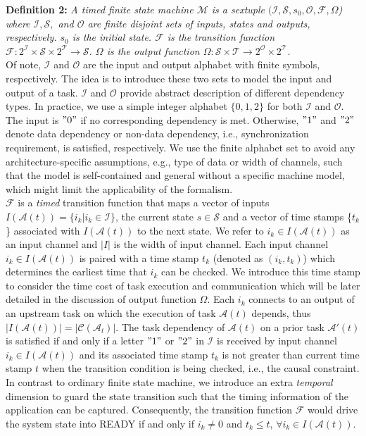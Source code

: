  \noindent \textbf{Definition 2:}\label{def:machine} \textit{ A timed finite state machine $\mathcal M$ is a sextuple $(\mathcal I,\mathcal S, s_{0}, \mathcal O,\mathcal F, \Omega$) where $\mathcal I,\mathcal S,$ and $\mathcal O $ are finite disjoint sets of inputs, states and outputs, respectively. $s_{0}$ is the initial state. $\mathcal F$ is the transition function $\mathcal F: 2^{\mathcal I} \times \mathcal S \times 2^{\mathcal T} \rightarrow \mathcal S$. $\Omega$ is the output function $\Omega: \mathcal S\times \mathcal T \rightarrow 2^{\mathcal O}\times 2^{\mathcal T}$.}\\
 \indent Of note, $\mathcal I$ and $\mathcal O$ are the input and output alphabet with finite symbols, respectively. The idea is to introduce these two sets to model the input and output of a task. $\mathcal I$ and $\mathcal O$ provide abstract description of different dependency types. In practice, we use a simple integer alphabet $\{0,1,2\}$ for both $\mathcal I$ and $\mathcal O$. The input is $"0"$ if no corresponding dependency is met. Otherwise, $"1"$ and $"2"$ denote data dependency or non-data dependency, i.e., synchronization requirement, is satisfied, respectively. We use the finite alphabet set to avoid any architecture-specific assumptions, e.g., type of data or width of channels, such that the model is self-contained and general without a specific machine model, which might limit the applicability of the formalism.\\
  \indent $\mathcal F$ is a \textit {timed} transition function that maps a vector of inputs $I(\mathcal A(t))=\{i_k|i_k \in \mathcal I\}$, the current state $s \in \mathcal S$ and a vector of time stamps \{$t_k$\} associated with $I(\mathcal A(t))$ to the next state.  We refer to $i_k \in I(\mathcal A(t))$ as an input channel and $|I|$ is the width of input channel. Each input channel  $i_k \in I(\mathcal A(t))$ is paired with a time stamp $t_k$ (denoted as $(i_k, t_k)$) which determines the earliest time that $i_k$ can be checked. We introduce this time stamp to consider the time cost of task execution and communication which will be later detailed in the discussion of output function $\Omega$. Each $i_k$ connects to an output of an upstream task on which the execution of task $\mathcal A(t)$ depends, thus $|I(\mathcal A(t))|=|\mathcal C(\mathcal A_{t})|$. The task dependency of $\mathcal A(t)$ on a prior task $\mathcal A'(t)$ is satisfied if and only if a letter $"1"$ or $"2"$ in $\mathcal I$ is received by input channel $i_k \in I(\mathcal A(t))$ and its associated time stamp $t_k$ is not greater than current time stamp $t$ when the transition condition is being checked, i.e., the causal constraint. In contrast to ordinary finite state machine, we introduce an extra \textit{temporal} dimension to guard the state transition such that the timing information of the application can be captured. Consequently, the transition function $\mathcal F$ would drive the system state into READY if and only if $i_k \neq 0$ and $t_k \leq t$, $\forall i_k  \in I(\mathcal A(t))$.\\
